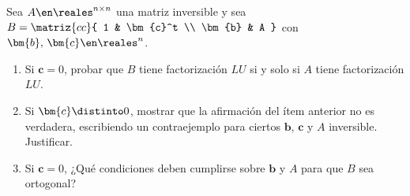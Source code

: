\begin{enunciado}{\ejExtra} 
  Sea $A \en \reales^{n \times n}$ una matriz inversible y sea
  $B =
    \matriz{cc}{
      1 & \bm{c}^t \\
      \bm{b} & A
    }$ con $\bm{b},\, \bm{c}\en \reales^n$.

  \begin{enumerate}[label=\alph*)]
    \item Si $\bm{c} = 0$, probar que $B$ tiene factorización $LU$ si y solo si $A$ tiene factorización $LU$.

    \item Si $\bm{c} \distinto 0$, mostrar que la afirmación del ítem anterior no es verdadera, escribiendo un contraejemplo para ciertos $\bm{b}$, $\bm{c}$
          y $A$ inversible. Justificar.

    \item Si $\bm{c} = 0$, ¿Qué condiciones deben cumplirse sobre $\bm{b}$ y $A$ para que $B$ sea ortogonal?
  \end{enumerate}
\end{enunciado}
\def\bloques{
  \begin{tikzpicture}[baseline=0, scale = 1.3, every node/.style={font=\tiny}]
    \draw[blue, thin, fill=blue!10,yshift = 0, xshift = -12] (-37px, 20px) rectangle ++(13px,13px) node[midway]{$1\times 1$};
    \draw[OliveGreen, thin, fill=OliveGreen!10,yshift = 0, xshift = -12] (-20px, 20px) rectangle ++(80px,13px) node[midway]{$1\times n$};
    \draw[orange, thin, fill=orange!10,yshift = 0, xshift = -12] (-20px, -32px) rectangle ++(80px,50px) node[midway]{$n \times n$};
    \draw[violet, thin, fill=violet!10,yshift = 0, xshift = -12] (-37px, -32px) rectangle ++(13px,50px)node[midway]{$n \times 1$};
  \end{tikzpicture}
}
\def\bloqueAzul{
  \begin{tikzpicture}[baseline=10, scale = 0.5, every node/.style={font=\tiny}]
    \draw[blue, thin, fill=blue!10,yshift = 0, xshift = -12] (-37px, 20px) rectangle ++(13px,13px);
  \end{tikzpicture}
}
\def\bloqueAzulZ{
  \begin{tikzpicture}[baseline=10, scale = 0.5, every node/.style={font=\tiny}]
    \draw[blue, thin, fill=blue!10,yshift = 0, xshift = -12] (-37px, 20px) rectangle ++(13px,13px) node[midway]{$0$};
  \end{tikzpicture}
}
\def\bloqueVioletZ{
  \begin{tikzpicture}[baseline=0, scale = 0.5, every node/.style={font=\tiny}]
    \draw[violet, thin, fill=violet!10,yshift = 0, xshift = -12] (-37px, -32px) rectangle ++(13px,70px)
    node[midway]{$
          \begin{array}{c}
            0      \\
            \vdots \\
            0
          \end{array}
        $
      };
  \end{tikzpicture}
}
